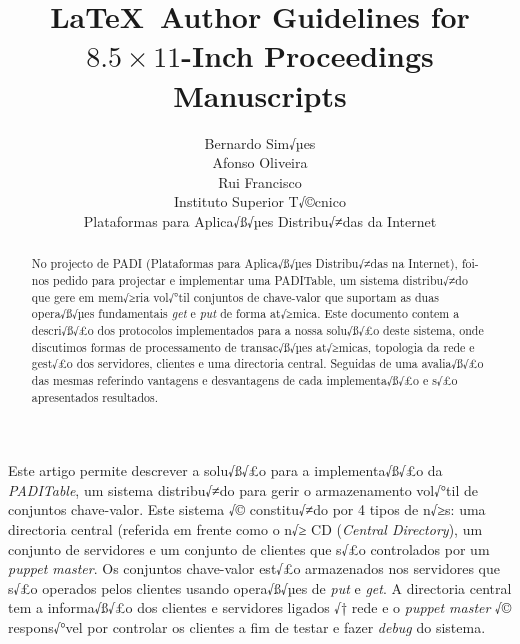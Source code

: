 \documentclass[times, 10pt,twocolumn]{article}
\begin{document}
\title{\LaTeX\ Author Guidelines 
       for {\boldmath $8.5 \times 11$-Inch} Proceedings Manuscripts}

\author{Bernardo Sim√µes\\ Afonso Oliveira\\ Rui Francisco\\
Instituto Superior T√©cnico\\Plataformas para Aplica√ß√µes Distribu√≠das da Internet\\
}

\maketitle
\thispagestyle{empty}

\begin{abstract}
No projecto de PADI (Plataformas para Aplica√ß√µes Distribu√≠das na Internet), foi-nos pedido para projectar e implementar uma PADITable, um sistema distribu√≠do que gere em mem√≥ria vol√°til conjuntos de chave-valor que suportam as duas opera√ß√µes fundamentais \emph{get} e \emph{put} de forma at√≥mica.
Este documento contem a descri√ß√£o dos protocolos implementados para a nossa solu√ß√£o deste sistema, onde discutimos formas de processamento de transac√ß√µes at√≥micas, topologia da rede e gest√£o dos servidores, clientes e uma directoria central. Seguidas de uma avalia√ß√£o das mesmas referindo vantagens e desvantagens de cada implementa√ß√£o e s√£o apresentados resultados.
\end{abstract}




Este artigo permite descrever a solu√ß√£o para a implementa√ß√£o da \emph{PADITable}, um sistema distribu√≠do para gerir o armazenamento vol√°til de conjuntos chave-valor. Este sistema √© constitu√≠do por 4 tipos de n√≥s: uma directoria central (referida em frente como o n√≥ CD (\emph{Central Directory}), um conjunto de servidores e um conjunto de clientes que s√£o controlados por um \emph{puppet master}. Os conjuntos chave-valor est√£o armazenados nos servidores que s√£o operados pelos clientes usando opera√ß√µes de \emph{put} e \emph{get}. A directoria central tem a informa√ß√£o dos clientes e servidores ligados √† rede e o \emph{puppet master} √© respons√°vel por controlar os clientes a fim de testar e fazer \emph{debug} do sistema.
\end{document}
